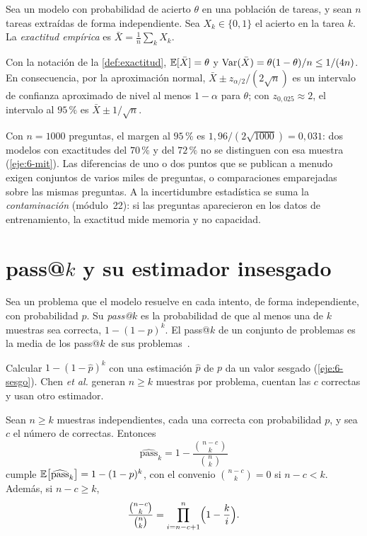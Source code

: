 \begin{definicion}\label{def:exactitud}
Sea un modelo con probabilidad de acierto $\theta$ en una población de tareas, y sean $n$ tareas extraídas de forma independiente. Sea $X_k\in\{0,1\}$ el acierto en la tarea $k$. La \emph{exactitud empírica} es $\bar X=\frac1n\sum_kX_k$.
\end{definicion}

\begin{proposicion}\label{prop:ic}
Con la notación de la \cref{def:exactitud}, $\mathbb{E}[\bar X]=\theta$ y $\operatorname{Var}(\bar X)=\theta(1-\theta)/n\le 1/(4n)$. En consecuencia, por la aproximación normal, $\bar X\pm z_{\alpha/2}/(2\sqrt n)$ es un intervalo de confianza aproximado de nivel al menos $1-\alpha$ para $\theta$; con $z_{0{,}025}\approx 2$, el intervalo al $95\,\%$ es $\bar X\pm 1/\sqrt n$.
\end{proposicion}

Con $n=1000$ preguntas, el margen al $95\,\%$ es $1{,}96/(2\sqrt{1000})=0{,}031$: dos modelos con exactitudes del $70\,\%$ y del $72\,\%$ no se distinguen con esa muestra (\cref{eje:6-mit}). Las diferencias de uno o dos puntos que se publican a menudo exigen conjuntos de varios miles de preguntas, o comparaciones emparejadas sobre las mismas preguntas. A la incertidumbre estadística se suma la \emph{contaminación} (módulo~22): si las preguntas aparecieron en los datos de entrenamiento, la exactitud mide memoria y no capacidad.

\section{pass@\texorpdfstring{$k$}{k} y su estimador insesgado}

\begin{definicion}[pass@$k$]\label{def:passk}
Sea un problema que el modelo resuelve en cada intento, de forma independiente, con probabilidad $p$. Su \emph{pass@$k$} es la probabilidad de que al menos una de $k$ muestras sea correcta, $1-(1-p)^{k}$. El pass@$k$ de un conjunto de problemas es la media de los pass@$k$ de sus problemas~\cite[§2.1]{chen}.
\end{definicion}

Calcular $1-(1-\hat p)^{k}$ con una estimación $\hat p$ de $p$ da un valor sesgado (\cref{eje:6-sesgo}). Chen \emph{et al.} generan $n\ge k$ muestras por problema, cuentan las $c$ correctas y usan otro estimador.

\begin{proposicion}\label{prop:passk}
Sean $n\ge k$ muestras independientes, cada una correcta con probabilidad $p$, y sea $c$ el número de correctas. Entonces
\[
\widehat{\mathrm{pass}}_k=1-\frac{\binom{n-c}{k}}{\binom nk}
\]
cumple $\mathbb{E}\bigl[\widehat{\mathrm{pass}}_k\bigr]=1-(1-p)^{k}$, con el convenio $\binom{n-c}{k}=0$ si $n-c<k$. Además, si $n-c\ge k$,
\[
\frac{\binom{n-c}{k}}{\binom nk}=\prod_{i=n-c+1}^{n}\Bigl(1-\frac ki\Bigr).
\]
\end{proposicion}


